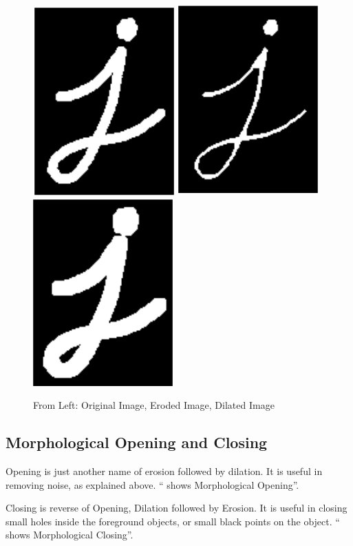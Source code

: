 \begin{figure}[htp]

\centering
\includegraphics[width=.3\textwidth]{figures/Original}\hfill
\includegraphics[width=.3\textwidth]{figures/Erosion}\hfill
\includegraphics[width=.3\textwidth]{figures/Dilation}

\caption{From Left: Original Image, Eroded Image, Dilated Image}
\label{fig:Morpho}

\end{figure}


\subsection{Morphological Opening and Closing}
Opening is just another name of erosion followed by dilation. It is useful in removing noise, as explained above. `` shows Morphological Opening''.

Closing is reverse of Opening, Dilation followed by Erosion. It is useful in closing small holes inside the foreground
objects, or small black points on the object. `` shows Morphological Closing''.

